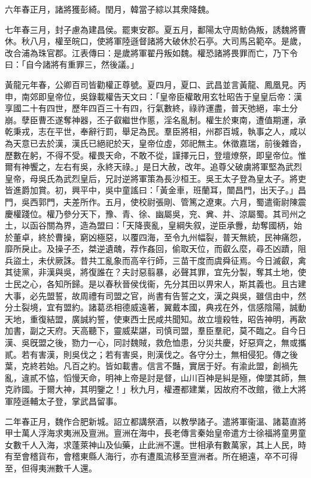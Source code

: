 \begin{pinyinscope}
六年春正月，諸將獲彭綺。閏月，韓當子綜以其衆降魏。

七年春三月，封子慮為建昌侯。罷東安郡。夏五月，鄱陽太守周魴偽叛，誘魏將曹休。秋八月，權至皖口，使將軍陸遜督諸將大破休於石亭。大司馬呂範卒。是歲，改合浦為珠官郡。江表傳曰：是歲將軍翟丹叛如魏。權恐諸將畏罪而亡，乃下令曰：「自今諸將有重罪三，然後議。」

黃龍元年春，公卿百司皆勸權正尊號。夏四月，夏口、武昌並言黃龍、鳳凰見。丙申，南郊即皇帝位，吳錄載權告天文曰：「皇帝臣權敢用玄牡昭告于皇皇后帝：漢享國二十有四世，歷年四百三十有四，行氣數終，祿祚運盡，普天弛絕，率土分崩。孽臣曹丕遂奪神器，丕子叡繼世作慝，淫名亂制。權生於東南，遭值期運，承乾秉戎，志在平世，奉辭行罰，舉足為民。羣臣將相，州郡百城，執事之人，咸以為天意已去於漢，漢氏已絕祀於天，皇帝位虛，郊祀無主。休徵嘉瑞，前後雜沓，歷數在躬，不得不受。權畏天命，不敢不從，謹擇元日，登壇燎祭，即皇帝位。惟爾有神饗之，左右有吳，永終天祿。」是日大赦，改年。追尊父破虜將軍堅為武烈皇帝，母吳氏為武烈皇后，兄討逆將軍策為長沙桓王。吳王太子登為皇太子。將吏皆進爵加賞。初，興平中，吳中童謠曰：「黃金車，班蘭耳，闓昌門，出天子。」昌門，吳西郭門，夫差所作。五月，使校尉張剛、管篤之遼東。六月，蜀遣衞尉陳震慶權踐位。權乃參分天下，豫、青、徐、幽屬吳，兖、兾、并、涼屬蜀。其司州之土，以函谷關為界，造為盟曰：「天降喪亂，皇綱失叙，逆臣承釁，劫奪國柄，始於董卓，終於曹操，窮凶極惡，以覆四海，至令九州幅裂，普天無統，民神痛怨，靡所戾止。及操子丕，桀逆遺醜，荐作姦回，偷取天位，而叡么麼，尋丕凶蹟，阻兵盜土，未伏厥誅。昔共工亂象而高辛行師，三苗干度而虞舜征焉。今日滅叡，禽其徒黨，非漢與吳，將復誰在？夫討惡翦暴，必聲其罪，宜先分製，奪其土地，使士民之心，各知所歸。是以春秋晉侯伐衞，先分其田以畀宋人，斯其義也。且古建大事，必先盟誓，故周禮有司盟之官，尚書有告誓之文，漢之與吳，雖信由中，然分土裂境，宜有盟約。諸葛丞相德威遠著，翼戴本國，典戎在外，信感陰陽，誠動天地，重復結盟，廣誠約誓，使東西士民咸共聞知。故立壇殺牲，昭告神明，再歃加書，副之天府。天高聽下，靈威棐諶，司慎司盟，羣臣羣祀，莫不臨之。自今日漢、吳旣盟之後，勠力一心，同討魏賊，救危恤患，分災共慶，好惡齊之，無或攜貳。若有害漢，則吳伐之；若有害吳，則漢伐之。各守分土，無相侵犯。傳之後葉，克終若始。凡百之約。皆如載書。信言不豔，實居于好。有渝此盟，創禍先亂，違貳不恊，慆慢天命，明神上帝是討是督，山川百神是糾是殛，俾墜其師，無克祚國。于爾大神，其明鑒之！」秋九月，權遷都建業，因故府不改館，徵上大將軍陸遜輔太子登，掌武昌留事。

二年春正月，魏作合肥新城。詔立都講祭酒，以教學諸子。遣將軍衞溫、諸葛直將甲士萬人浮海求夷洲及亶洲。亶洲在海中，長老傳言秦始皇帝遣方士徐福將童男童女數千人入海，求蓬萊神山及仙藥，止此洲不還。世相承有數萬家，其上人民，時有至會稽貨布，會稽東縣人海行，亦有遭風流移至亶洲者。所在絕遠，卒不可得至，但得夷洲數千人還。


\end{pinyinscope}
